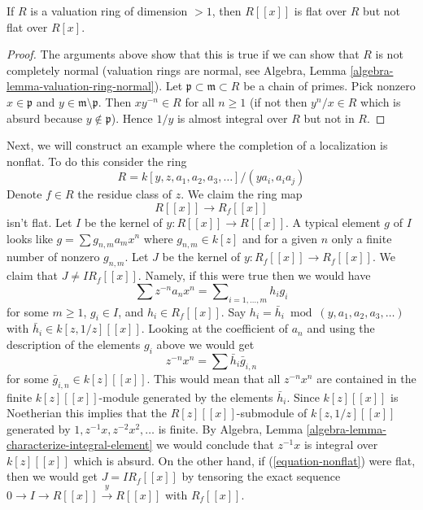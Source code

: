 \begin{lemma}
\label{lemma-completion-polynomial-ring-not-flat-bis}
If $R$ is a valuation ring of dimension $> 1$, then $R[[x]]$
is flat over $R$ but not flat over $R[x]$.
\end{lemma}

\begin{proof}
The arguments above show that this is true if we can show that
$R$ is not completely normal (valuation rings are
normal, see Algebra, Lemma \ref{algebra-lemma-valuation-ring-normal}).
Let $\mathfrak p \subset \mathfrak m \subset R$ be a chain of primes.
Pick nonzero $x \in \mathfrak p$ and $y \in \mathfrak m \setminus \mathfrak p$.
Then $x y^{-n} \in R$ for all $n \geq 1$ (if not then $y^n/x \in R$
which is absurd because $y \not \in \mathfrak p$). Hence $1/y$ is
almost integral over $R$ but not in $R$.
\end{proof}

\noindent
Next, we will construct an example where the completion of a localization
is nonflat. To do this consider the ring
$$
R = k[y, z, a_1, a_2, a_3, \ldots]/(ya_i, a_i a_j)
$$
Denote $f \in R$ the residue class of $z$. We claim the ring map
\begin{equation}
\label{equation-nonflat}
R[[x]] \longrightarrow R_f[[x]]
\end{equation}
isn't flat. Let $I$ be the kernel of $y : R[[x]] \to R[[x]]$. A typical
element $g$ of $I$ looks like $g = \sum g_{n, m} a_mx^n$
where $g_{n, m} \in k[z]$ and for a given $n$ only a finite number of
nonzero $g_{n, m}$. Let $J$ be the kernel of $y : R_f[[x]] \to R_f[[x]]$.
We claim that $J \not = I R_f[[x]]$. Namely, if this were true then we
would have
$$
\sum z^{-n} a_n x^n = \sum\nolimits_{i = 1, \ldots, m} h_i g_i
$$
for some $m \geq 1$, $g_i \in I$, and $h_i \in R_f[[x]]$. Say
$h_i = \bar h_i \bmod (y, a_1, a_2, a_3, \ldots)$
with $\bar h_i \in k[z, 1/z][[x]]$.  Looking at the coefficient of
$a_n$ and using the description of the elements $g_i$ above we would get
$$
z^{-n} x^n = \sum \bar h_i \bar g_{i, n}
$$
for some $\bar g_{i, n} \in k[z][[x]]$. This would mean that
all $z^{-n}x^n$ are contained in the finite $k[z][[x]]$-module
generated by the elements $\bar h_i$. Since $k[z][[x]]$ is Noetherian
this implies that the $R[z][[x]]$-submodule of $k[z, 1/z][[x]]$
generated by $1, z^{-1}x, z^{-2}x^2, \ldots$ is finite. By
Algebra, Lemma \ref{algebra-lemma-characterize-integral-element}
we would conclude that $z^{-1}x$ is integral over $k[z][[x]]$
which is absurd. On the other hand,
if (\ref{equation-nonflat}) were flat, then we would
get $J = IR_f[[x]]$ by tensoring the exact sequence
$0 \to I \to R[[x]] \xrightarrow{y} R[[x]]$ with $R_f[[x]]$.

